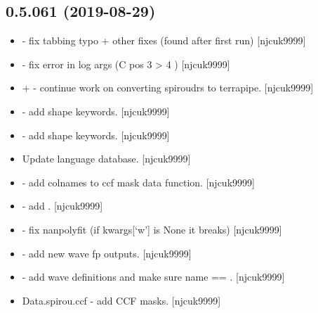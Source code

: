 \documentclass[a4paper,10pt,english]{report}
\begin{document}
\subsection{0.5.061 (2019-08-29)}
\label{\detokenize{misc/changelog:id81}}\begin{itemize}
\item {} 
 - fix tabbing typo + other fixes (found after
first run) {[}njcuk9999{]}

\item {} 
 - fix error in log args (C  pos 3 \textendash{}\textgreater{} 4 )
{[}njcuk9999{]}

\item {} 
 +  - continue work on
converting spiroudrs to terrapipe. {[}njcuk9999{]}

\item {} 
 - add shape keywords. {[}njcuk9999{]}

\item {} 
 - add shape keywords. {[}njcuk9999{]}

\item {} 
Update language database. {[}njcuk9999{]}

\item {} 
 - add colnames to ccf mask data function. {[}njcuk9999{]}

\item {} 
 - add . {[}njcuk9999{]}

\item {} 
 - fix nanpolyfit (if kwargs{[}‘w’{]} is None it
breaks) {[}njcuk9999{]}

\item {} 
 - add new wave fp
outputs. {[}njcuk9999{]}

\item {} 
 - add wave definitions and
make sure name == . {[}njcuk9999{]}

\item {} 
Data.spirou.ccf - add CCF masks. {[}njcuk9999{]}


\end{itemize}
\end{document}

